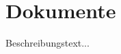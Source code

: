 \documentclass[11pt, oneside]{book}   		%
\begin{document}











%

%

%

%

%

%

%

%


\appendix
\renewcommand{\thechapter}{\Alph{chapter}}

\setcounter{chapter}{0} 

\chapter{Dokumente}
Beschreibungstext...
\end{document}
